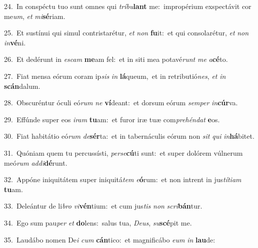 {\numbfont\textcolor{\numbcolor}{24.}}~In conspéctu tuo sunt omnes qui \textit{trí}\-\textit{bu}\textbf{lant} me:~\star impropérium exspectávit cor me\-\textit{um}\-, \textit{et} \textit{mi}\-\textbf{sé}riam.\par
{\numbfont\textcolor{\numbcolor}{25.}}~Et sustínui qui simul contristarétur, \textit{et} \textit{non} \textbf{fu}\-it:~\star et qui consolarétur, \textit{et} \textit{non} \textit{in}\-\textbf{vé}ni.\par
{\numbfont\textcolor{\numbcolor}{26.}}~Et dedérunt in \textit{es}\-\textit{cam} \textbf{me}\-am fel:~\star et in siti mea potavé\textit{runt} \textit{me} \textit{a}\-\textbf{cé}to.\par
{\numbfont\textcolor{\numbcolor}{27.}}~Fiat mensa eórum coram ip\textit{sis} \textit{in} \textbf{lá}\-queum,~\star et in retributió\-\textit{nes}\-, \textit{et} \textit{in} \textbf{scán}\-dalum.\par
{\numbfont\textcolor{\numbcolor}{28.}}~Obscuréntur óculi eó\textit{rum} \textit{ne} \textbf{ví}\-deant:~\star et dorsum eórum \textit{sem}\-\textit{per} \textit{in}\-\textbf{cúr}va.\par
{\numbfont\textcolor{\numbcolor}{29.}}~Effúnde super eos \textit{i}\-\textit{ram} \textbf{tu}\-am:~\star et furor iræ tuæ com\-\textit{pre}\-\textit{hén}\textit{dat} \textbf{e}\-os.\par
{\numbfont\textcolor{\numbcolor}{30.}}~Fiat habitátio eó\textit{rum} \textit{de}\-\textbf{sér}ta:~\star et in tabernáculis eórum non \textit{sit} \textit{qui} \textit{in}\-\textbf{há}bitet.\par
{\numbfont\textcolor{\numbcolor}{31.}}~Quóniam quem tu percussísti, \textit{per}\-\textit{se}\textbf{cú}ti sunt:~\star et super dolórem vúlnerum meó\textit{rum} \textit{ad}\-\textit{di}\textbf{dé}runt.\par
{\numbfont\textcolor{\numbcolor}{32.}}~Appóne iniquitátem super iniquitá\textit{tem} \textit{e}\-\textbf{ó}rum:~\star et non intrent in jus\-\textit{tí}\-\textit{ti}\textit{am} \textbf{tu}\-am.\par
{\numbfont\textcolor{\numbcolor}{33.}}~Deleántur de li\textit{bro} \textit{vi}\-\textbf{vén}tium:~\star et cum jus\textit{tis} \textit{non} \textit{scri}\-\textbf{bán}tur.\par
{\numbfont\textcolor{\numbcolor}{34.}}~Ego sum pau\textit{per} \textit{et} \textbf{do}\-lens:~\star salus tua, \textit{De}\-\textit{us}, \textit{su}\-\textbf{scé}pit me.\par
{\numbfont\textcolor{\numbcolor}{35.}}~Laudábo nomen De\textit{i} \textit{cum} \textbf{cán}\-tico:~\star et magnificábo \textit{e}\-\textit{um} \textit{in} \textbf{lau}\-de:\par
